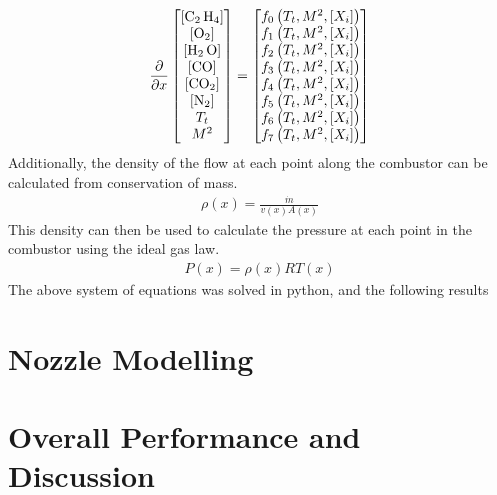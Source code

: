 \documentclass[a4paper]{article}
\begin{document}
\begin{align}
    \frac{\partial}{\partial x} 
    \begin{bmatrix}
    \left[ \ce{C_2 H_4} \right] \\
    \left[ \ce{O_2} \right] \\
    \left[ \ce{H_2 O} \right] \\
    \left[ \ce{CO} \right] \\
    \left[ \ce{CO_2} \right] \\
    \left[ \ce{N_2} \right] \\
    T_t\\
    M^2
    \end{bmatrix}
    =
    \begin{bmatrix}
        f_0 \left(T_t, M^2, \left[ X_i \right]\right)\\
        f_1 \left(T_t, M^2, \left[ X_i \right]\right)\\
        f_2 \left(T_t, M^2, \left[ X_i \right]\right)\\
        f_3 \left(T_t, M^2, \left[ X_i \right]\right)\\
        f_4 \left(T_t, M^2, \left[ X_i \right]\right)\\
        f_5 \left(T_t, M^2, \left[ X_i \right]\right)\\
        f_6 \left(T_t, M^2, \left[ X_i \right]\right)\\
        f_7 \left(T_t, M^2, \left[ X_i \right]\right)
    \end{bmatrix}
\end{align}
Additionally, the density of the flow at each point along the combustor can be calculated from conservation of mass.
\begin{align}
    \rho(x) = \frac{\dot{m}}{v(x) A(x)}
\end{align}
This density can then be used to calculate the pressure at each point in the combustor using the ideal gas law.
\begin{align}
    P(x) = \rho(x) R T(x)
\end{align}
The above system of equations was solved in python, and the following results 

\section{Nozzle Modelling}

\section{Overall Performance and Discussion}
\end{document}
